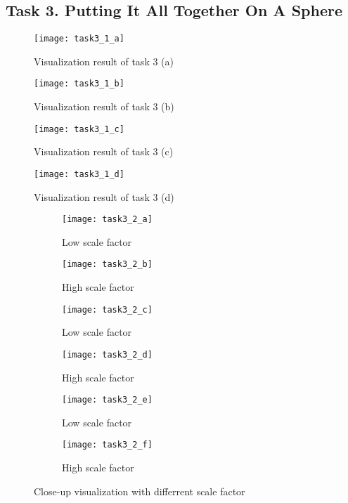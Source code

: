 \documentclass[11pt]{article}
\begin{document}
\subsection*{Task 3. Putting It All Together On A Sphere}

\begin{figure}[H]
\centering
\texttt{[image: task3\_1\_a]}
\caption{Visualization result of task 3 (a)}
\label{fig: task3_1_a}
\end{figure}

\begin{figure}[H]
\centering
\texttt{[image: task3\_1\_b]}
\caption{Visualization result of task 3 (b)}
\label{fig: task3_1_b}
\end{figure}

\begin{figure}[H]
\centering
\texttt{[image: task3\_1\_c]}
\caption{Visualization result of task 3 (c)}
\label{fig: task3_1_c}
\end{figure}

\begin{figure}[H]
\centering
\texttt{[image: task3\_1\_d]}
\caption{Visualization result of task 3 (d)}
\label{fig: task3_1_d}
\end{figure}


\begin{figure}[H]
\begin{subfigure}{.5\textwidth}
  \centering
  \texttt{[image: task3\_2\_a]}
  \caption{Low scale factor}
  \label{fig:task3_2_a}
\end{subfigure}
\begin{subfigure}{.5\textwidth}
  \centering
  \texttt{[image: task3\_2\_b]}
  \caption{High  scale factor}
  \label{fig:task3_2_b}
\end{subfigure}

\begin{subfigure}{.5\textwidth}
  \centering
  \texttt{[image: task3\_2\_c]} 
  \caption{Low  scale factor}
  \label{fig:task3_2_c}
\end{subfigure}
\begin{subfigure}{.5\textwidth}
  \centering
  \texttt{[image: task3\_2\_d]}
  \caption{High  scale factor}
  \label{fig:task3_2_d}
\end{subfigure}

\begin{subfigure}{.5\textwidth}
  \centering
  \texttt{[image: task3\_2\_e]} 
  \caption{Low  scale factor}
  \label{fig:task3_2_e}
\end{subfigure}
\begin{subfigure}{.5\textwidth}
  \centering
  \texttt{[image: task3\_2\_f]}
  \caption{High  scale factor}
  \label{fig:task3_2_f}
\end{subfigure}
\caption{Close-up visualization with differrent  scale factor}
\label{fig:task3_2}
\end{figure}
\end{document}
